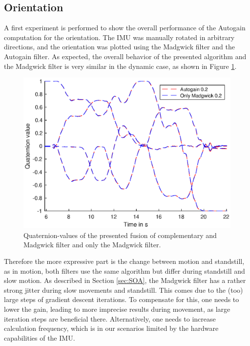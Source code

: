 \documentclass[letterpaper, 10 pt, conference]{ieeeconf}  %
\begin{document}
\subsection{Orientation}
A first experiment is performed to show the overall performance of the Autogain computation for the orientation. The IMU was manually rotated in arbitrary directions, and the orientation was plotted using the Madgwick filter and the Autogain filter.
As expected, the overall behavior of the presented algorithm and the Madgwick filter is very similar in the dynamic case, as shown in Figure \ref{quaternion1}.
\begin{figure}
\includegraphics[width=\linewidth]{./graphics/AutoVsMad.eps}
\caption{Quaternion-values of the presented fusion of complementary and Madgwick filter and only the Madgwick filter.}
\label{quaternion1}
\end{figure}
Therefore the more expressive part is the change between motion and standstill, as in motion, both filters use the same algorithm but differ during standstill and slow motion.
As described in Section \ref{sec:SOA}, the Madgwick filter has a rather strong jitter during slow movements and standstill. 
This comes due to the (too) large steps of gradient descent iterations.
To compensate for this, one needs to lower the gain, leading to more imprecise results during movement, as large iteration steps are beneficial there.
Alternatively, one needs to increase calculation frequency, which is in our scenarios limited by the hardware capabilities of the IMU.
\end{document}
